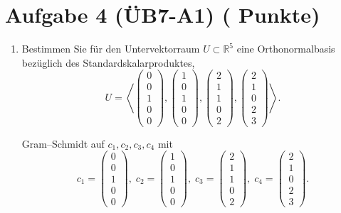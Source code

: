 \documentclass[11pt, a4paper]{article}
\newcommand{\aufgabe}[2]{%
  \section*{\Large\bfseries Aufgabe #1%
  \if\relax\detokenize{#2}\relax\else \hfill\normalfont\normalsize(#2 Punkte)\fi}%
  \vspace{-1.5ex}
}
\begin{document}
\aufgabe{4 (ÜB7-A1)}{}
\begin{enumerate}
  \item Bestimmen Sie für den Untervektorraum $U\subset\mathbb{R}^5$ eine Orthonormalbasis bezüglich des Standardskalarproduktes,
  \[
    U=\left\langle
    \begin{pmatrix}0\\0\\1\\0\\0\end{pmatrix},
    \begin{pmatrix}1\\0\\1\\0\\0\end{pmatrix},
    \begin{pmatrix}2\\1\\1\\0\\2\end{pmatrix},
    \begin{pmatrix}2\\1\\0\\2\\3\end{pmatrix}
    \right\rangle .
  \]
  \begin{framed}
  Gram–Schmidt auf $c_1,c_2,c_3,c_4$ mit
  \[
  c_1=\begin{pmatrix}0\\0\\1\\0\\0\end{pmatrix},\;
  c_2=\begin{pmatrix}1\\0\\1\\0\\0\end{pmatrix},\;
  c_3=\begin{pmatrix}2\\1\\1\\0\\2\end{pmatrix},\;
  c_4=\begin{pmatrix}2\\1\\0\\2\\3\end{pmatrix}.
\]
\end{framed}
\end{enumerate}
\end{document}
